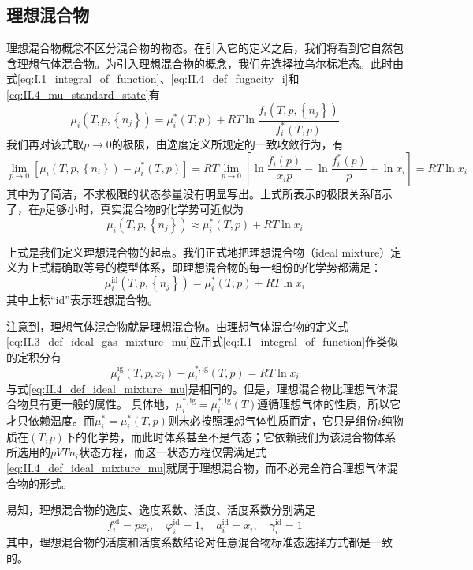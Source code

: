 \documentclass[main.tex]{subfiles}
\begin{document}
\subsection{理想混合物}
理想混合物概念不区分混合物的物态。在引入它的定义之后，我们将看到它自然包含理想气体混合物。为引入理想混合物的概念，我们先选择拉乌尔标准态。此时由式\eqref{eq:I.1_integral_of_function}、\eqref{eq:II.4_def_fugacity_i}和\eqref{eq:II.4_mu_standard_state}有
\[\mu_i\left(T,p,\left\{n_j\right\}\right)=\mu_i^*\left(T,p\right)+RT\ln\frac{f_i\left(T,p,\left\{n_j\right\}\right)}{f_i^*\left(T,p\right)}\]
我们再对该式取$p\rightarrow 0$的极限，由逸度定义所规定的一致收敛行为，有
\[\lim_{p\to 0}\left[\mu_i\left(T,p,\left\{n_i\right\}\right)-\mu_i^*\left(T,p\right)\right]=RT\lim_{p\to 0}\left[\ln\frac{f_i\left(p\right)}{x_ip}-\ln\frac{f_i^*\left(p\right)}{p}+\ln x_i\right]=RT\ln x_i\]
其中为了简洁，不求极限的状态参量没有明显写出。上式所表示的极限关系暗示了，在$p$足够小时，真实混合物的化学势可近似为
\[\mu_i\left(T,p,\left\{n_j\right\}\right)\approx\mu_i^*\left(T,p\right)+RT\ln x_i\]

上式是我们定义理想混合物的起点。我们正式地把理想混合物（ideal mixture）定义为上式精确取等号的模型体系，即理想混合物的每一组份的化学势都满足：
\begin{equation}\label{eq:II.4_def_ideal_mixture_mu}
    \mu_i^\text{id}\left(T,p,\left\{n_j\right\}\right)=\mu_i^*\left(T,p\right)+RT\ln x_i
\end{equation}
其中上标“id”表示理想混合物。

注意到，理想气体混合物就是理想混合物。由理想气体混合物的定义式\eqref{eq:II.3_def_ideal_gas_mixture_mu}应用式\eqref{eq:I.1_integral_of_function}作类似的定积分有
\[\mu_i^\text{ig}\left(T,p,x_i\right)-\mu_i^{*,\text{ig}}\left(T,p\right)=RT\ln x_i\]
与式\eqref{eq:II.4_def_ideal_mixture_mu}是相同的。但是，理想混合物比理想气体混合物具有更一般的属性。 具体地，$\mu_i^{*,\text{ig}}=\mu_i^{*,\text{ig}}\left(T\right)$遵循理想气体的性质，所以它才只依赖温度。而$\mu_i^*=\mu_i^*\left(T,p\right)$则未必按照理想气体性质而定，它只是组份$i$纯物质在$\left(T,p\right)$下的化学势，而此时体系甚至不是气态；它依赖我们为该混合物体系所选用的$pVTn_i$状态方程，而这一状态方程仅需满足式\eqref{eq:II.4_def_ideal_mixture_mu}就属于理想混合物，而不必完全符合理想气体混合物的形式。

易知，理想混合物的逸度、逸度系数、活度、活度系数分别满足
\[f_i^\text{id}=px_i,\quad\varphi_i^\text{id}=1,\quad a_i^\text{id}=x_i,\quad\gamma_i^\text{id}=1\]
其中，理想混合物的活度和活度系数结论对任意混合物标准态选择方式都是一致的。
\end{document}
